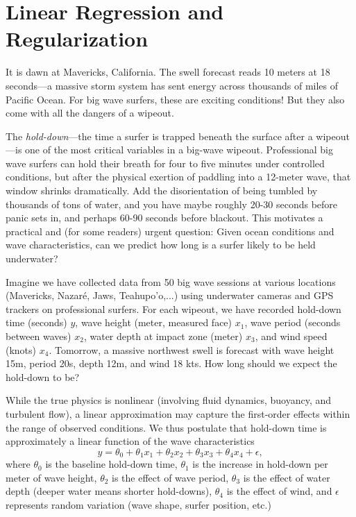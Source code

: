 \chapter{Linear Regression and Regularization}
\label{c:linreg_ls}

\newcommand{\regpar}{\theta}



It is dawn at Mavericks, California. The swell forecast reads 10 meters at 18 seconds---a 
massive storm system has sent energy across thousands of miles of Pacific Ocean. 
For big wave surfers, these are exciting conditions! But they also come with all the dangers of a wipeout.

The {\em hold-down}---the time a surfer is trapped beneath the surface after a 
wipeout---is one of the most critical variables in a big-wave wipeout.
Professional big wave surfers can hold their breath for four to five minutes under controlled 
conditions, but after the physical exertion of paddling into a 12-meter wave, that 
window shrinks dramatically. Add the disorientation of being tumbled by thousands of tons of water, and you have maybe roughly 20-30 seconds before panic sets in, and perhaps 60-90 seconds before blackout.
This motivates a practical and (for some readers) urgent question: Given ocean conditions and wave characteristics, can we predict how long is a surfer likely to be held underwater?

Imagine we have collected data from 50 big wave sessions at various locations 
(Mavericks, Nazaré, Jaws, Teahupo'o,...) using underwater cameras and GPS trackers on  professional surfers. For each wipeout, we have recorded hold-down time (seconds) $y$,  wave height (meter, measured face) $x_1$,
wave period (seconds between waves) $x_2$,
 water depth at impact zone (meter) $x_3$, and
 wind speed (knots) $x_4$.
Tomorrow, a massive northwest swell is forecast with 
wave height 15m, period 20s, depth 12m, and wind 18 kts.
How long should we expect the hold-down to be? 

While the true physics is nonlinear (involving fluid dynamics, buoyancy, and 
turbulent flow), a linear approximation may capture the first-order effects within the  range of observed conditions. We thus postulate that hold-down time is approximately a linear function of the 
wave characteristics
\begin{equation*}
  y = \regpar_0 + \regpar_1 x_1 + \regpar_2 x_2 + \regpar_3 x_3 + \regpar_4 x_4 + \epsilon,
\end{equation*}
where $\regpar_0$ is the baseline hold-down time,
$\regpar_1$ is the increase in hold-down per meter of wave height, $\regpar_2$ is the effect of wave period, $\regpar_3$ is the effect of water depth (deeper water means shorter hold-downs), $\regpar_4$ is the effect of wind, and $\epsilon$ represents random variation (wave shape, surfer position, etc.)


